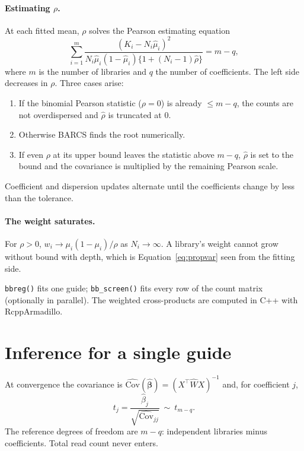 \documentclass[11pt]{article}
\begin{document}
\paragraph{Estimating $\rho$.}
At each fitted mean, $\rho$ solves the Pearson estimating equation
\begin{equation}
\sum_{i=1}^{m}\frac{(K_i-N_i\hat\mu_i)^2}
{N_i\hat\mu_i(1-\hat\mu_i)\{1+(N_i-1)\hat\rho\}}=m-q,
\label{eq:pearson}
\end{equation}
where $m$ is the number of libraries and $q$ the number of coefficients.  The
left side decreases in $\rho$.  Three cases arise:
\begin{enumerate}[itemsep=1pt]
\item If the binomial Pearson statistic ($\rho=0$) is already $\le m-q$, the
counts are not overdispersed and $\hat\rho$ is truncated at 0.
\item Otherwise BARCS finds the root numerically.
\item If even $\rho$ at its upper bound leaves the statistic above $m-q$,
$\hat\rho$ is set to the bound and the covariance is multiplied by the
remaining Pearson scale.
\end{enumerate}
Coefficient and dispersion updates alternate until the coefficients change by
less than the tolerance.

\paragraph{The weight saturates.}
For $\rho>0$, $w_i\to\mu_i(1-\mu_i)/\rho$ as $N_i\to\infty$.  A library's
weight cannot grow without bound with depth, which is Equation~\eqref{eq:propvar}
seen from the fitting side.

\begin{incode}
\texttt{bbreg()} fits one guide; \texttt{bb\_screen()} fits every row of the
count matrix (optionally in parallel).  The weighted cross-products are
computed in C++ with RcppArmadillo.
\end{incode}

\section{Inference for a single guide}

At convergence the covariance is $\widehat{\mathrm{Cov}}(\widehat{\boldsymbol\beta})
=(X^\top\widehat WX)^{-1}$ and, for coefficient $j$,
\begin{equation}
t_j=\frac{\hat\beta_j}{\sqrt{\widehat{\mathrm{Cov}}_{jj}}}\ \sim\ t_{m-q}.
\end{equation}
The reference degrees of freedom are $m-q$: independent libraries minus
coefficients.  Total read count never enters.
\end{document}
